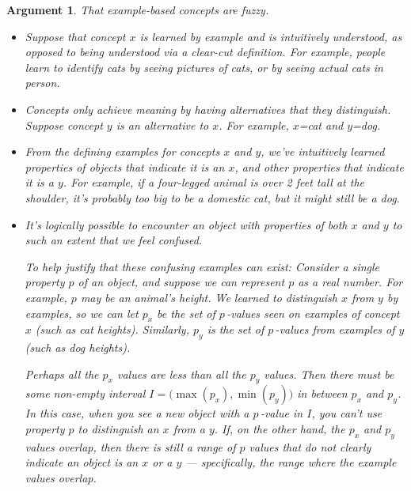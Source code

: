 \documentclass[9pt, twoside]{book}
\theoremstyle{argtstyle}
\newtheorem*{argt}{Argument}
\begin{document}
\begin{argt} That example-based concepts are fuzzy.
    \label{a5}
    \normalfont
    \begin{itemize}
        \item Suppose that concept $x$ is learned by example and is
            intuitively understood, as opposed to being understood via
            a clear-cut definition.
            For
            example, people learn to identify {\em cats}
            by seeing pictures of cats, 
            or by seeing actual cats in person.
        \item Concepts only achieve meaning by having alternatives that they
            distinguish. Suppose concept $y$ is an alternative to $x$.
            For example, $x$={\em cat} and $y$={\em dog}.
        \item From the defining examples for concepts $x$ and $y$, we've
            intuitively learned properties of objects
            that indicate it is an $x$, and other properties that indicate it is
            a $y$. For example, if a four-legged animal is over 2 feet tall at
            the
            shoulder, it's probably too big to be a domestic cat, but it might
            still be a dog.
        \item It's logically possible to encounter an object with properties of
            both $x$ and $y$ to such an extent that we feel confused.

            To help justify that these confusing examples can exist:
            Consider a single property $p$
            of an object, and suppose we can represent $p$ as a real number. For
            example, $p$ may be an animal's height. We learned to
            distinguish $x$ from $y$ by examples, so we can let $p_x$ be the set
            of $p$\,-values seen on examples of concept $x$ (such as cat
            heights).  Similarly, $p_y$
            is the set of $p$\,-values from examples of $y$ (such as dog
            heights).

            Perhaps all the $p_x$ values are less than all the $p_y$ values.
            Then there must be some non-empty interval
            $I=\big(\!\max(p_x), \min(p_y)\big)$ in between $p_x$ and $p_y$.
            In this case, when you see a new object with a $p$\,-value in $I$,
            you can't use property $p$ to distinguish an $x$ from a $y$.
            If, on the other hand, the $p_x$ and $p_y$ values overlap, then
            there is still a range of $p$ values
            that do not clearly indicate an object is an $x$ or a $y$ ---
            specifically, the range where the example values overlap.


\end{itemize}
\end{argt}
\end{document}
